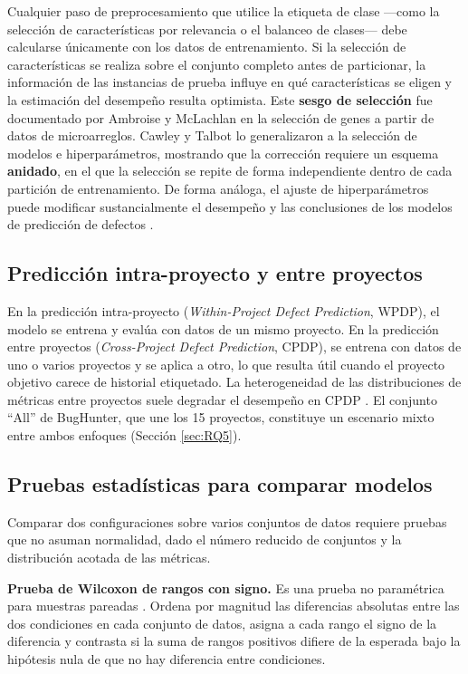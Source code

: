 Cualquier paso de preprocesamiento que utilice la etiqueta de clase ---como la selección de características por relevancia o el balanceo de clases--- debe calcularse únicamente con los datos de entrenamiento. Si la selección de características se realiza sobre el conjunto completo antes de particionar, la información de las instancias de prueba influye en qué características se eligen y la estimación del desempeño resulta optimista. Este \textbf{sesgo de selección} fue documentado por Ambroise y McLachlan \cite{ambroise2002} en la selección de genes a partir de datos de microarreglos. Cawley y Talbot \cite{cawley2010} lo generalizaron a la selección de modelos e hiperparámetros, mostrando que la corrección requiere un esquema \textbf{anidado}, en el que la selección se repite de forma independiente dentro de cada partición de entrenamiento. De forma análoga, el ajuste de hiperparámetros puede modificar sustancialmente el desempeño y las conclusiones de los modelos de predicción de defectos \cite{tantithamthavorn2019}.

\subsection{Predicción intra-proyecto y entre proyectos}

En la predicción intra-proyecto (\textit{Within-Project Defect Prediction}, WPDP), el modelo se entrena y evalúa con datos de un mismo proyecto. En la predicción entre proyectos (\textit{Cross-Project Defect Prediction}, CPDP), se entrena con datos de uno o varios proyectos y se aplica a otro, lo que resulta útil cuando el proyecto objetivo carece de historial etiquetado. La heterogeneidad de las distribuciones de métricas entre proyectos suele degradar el desempeño en CPDP \cite{cheng2022,sharma2023far}. El conjunto ``All'' de BugHunter, que une los 15 proyectos, constituye un escenario mixto entre ambos enfoques (Sección \ref{sec:RQ5}).

\subsection{Pruebas estadísticas para comparar modelos}

Comparar dos configuraciones sobre varios conjuntos de datos requiere pruebas que no asuman normalidad, dado el número reducido de conjuntos y la distribución acotada de las métricas.

\textbf{Prueba de Wilcoxon de rangos con signo.} Es una prueba no paramétrica para muestras pareadas \cite{wilcoxon1945}. Ordena por magnitud las diferencias absolutas entre las dos condiciones en cada conjunto de datos, asigna a cada rango el signo de la diferencia y contrasta si la suma de rangos positivos difiere de la esperada bajo la hipótesis nula de que no hay diferencia entre condiciones.

